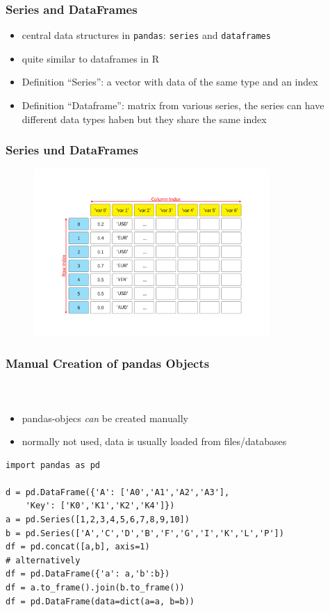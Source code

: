 \documentclass[english]{beamer}
\begin{document}
\begin{frame}
\frametitle{Series and DataFrames}

\begin{itemize}
\item central data structures in  \texttt{pandas}: \texttt{series} and \texttt{dataframes}
\item quite similar to dataframes in R
\item Definition \enquote{Series}: a vector with data of the same type and an index
\item Definition \enquote{Dataframe}: matrix from various series, the series can have different data types haben but they share the same index
\end{itemize}
\end{frame}

\begin{frame}
\frametitle{Series und DataFrames}

\begin{figure}
\begin{center}
\includegraphics[trim=50mm 55mm 45mm 55mm,width=0.8\textwidth]{Pictures/SeriesFrames.pdf}
\end{center}
\end{figure}

\end{frame}


\begin{frame}[containsverbatim]
\frametitle{Manual Creation of pandas Objects}
\framesubtitle{~}

\begin{itemize}
	\item pandas-objecs \textit{can} be created manually
	\item normally not used, data is usually loaded from files/databases
\end{itemize}

\begin{lstlisting}
import pandas as pd

d = pd.DataFrame({'A': ['A0','A1','A2','A3'], 
	'Key': ['K0','K1','K2','K4']})
a = pd.Series([1,2,3,4,5,6,7,8,9,10])
b = pd.Series(['A','C','D','B','F','G','I','K','L','P'])
df = pd.concat([a,b], axis=1)
# alternatively
df = pd.DataFrame({'a': a,'b':b})
df = a.to_frame().join(b.to_frame())
df = pd.DataFrame(data=dict(a=a, b=b))
\end{lstlisting}
\end{frame}
\end{document}
